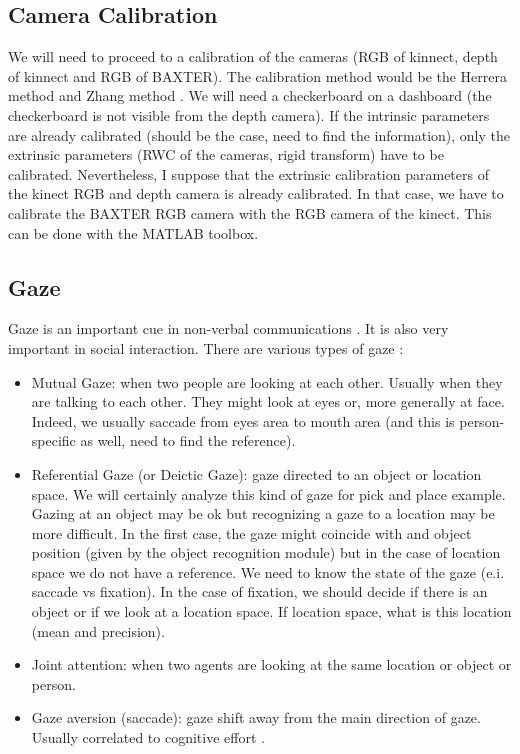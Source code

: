 \documentclass[11pt,a4paper]{article}
\begin{document}
\subsection{Camera Calibration}
We will need to proceed to a calibration of the cameras (RGB of kinnect, depth of kinnect and RGB of BAXTER). The calibration method would be the Herrera method \cite{Herrera2012} and Zhang method \cite{Zhang2000}. We will need a checkerboard on a dashboard (the checkerboard is not visible from the depth camera). If the intrinsic parameters are already calibrated (should be the case, need to find the information), only the extrinsic parameters (RWC of the cameras, rigid transform) have to be calibrated. Nevertheless, I suppose that the extrinsic calibration parameters of the kinect RGB and depth camera is already calibrated. In that case, we have to calibrate the BAXTER RGB camera with the RGB camera of the kinect. This can be done with the MATLAB toolbox.
\subsection{Gaze}
Gaze is an important cue in non-verbal communications \cite{Argyle1972}. It is also very important in social interaction. There are various types of gaze \cite{Admoni2017}:
\begin{itemize}
\item Mutual Gaze: when two people are looking at each other. Usually when they are talking to each other. They might look at eyes or, more generally at face. Indeed, we usually saccade from eyes area to mouth area (and this is person-specific as well, need to find the reference).
\item Referential Gaze (or Deictic Gaze): gaze directed to an object or location space. We will certainly analyze this kind of gaze for pick and place example. Gazing at an object may be ok but recognizing a gaze to a location may be more difficult. In the first case, the gaze might coincide with and object position (given by the object recognition module) but in the case of location space we do not have a reference. We need to know the state of the gaze (e.i. saccade vs fixation). In the case of fixation, we should decide if there is an object or if we look at a location space. If location space, what is this location (mean and precision).
\item Joint attention: when two agents are looking at the same location or object or person.
\item Gaze aversion (saccade): gaze shift away from the main direction of gaze. Usually correlated to cognitive effort \cite{Andrist2013}.
\end{itemize}
\end{document}

